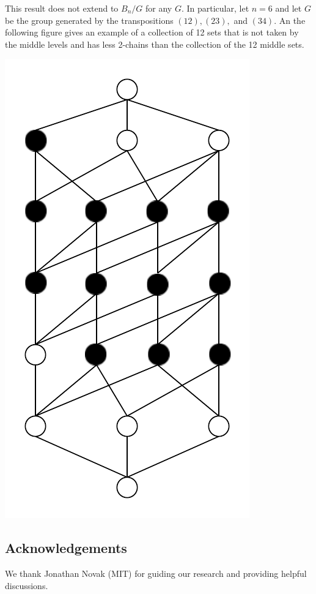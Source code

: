 \documentclass[12pt]{article}
\theoremstyle{plain}
\theoremstyle{definition}
\theoremstyle{remark}
\begin{document}
This result does not extend to $B_n / G$ for any $G$. In particular, let $n = 6$ and let $G$ be the group generated by the transpositions $(12), (23),$ and $(34)$. An the following figure gives an example of a collection of 12 sets that is not taken by the middle levels and has less 2-chains than the collection of the 12 middle sets.
\begin{center}
\includegraphics[scale=0.7]{counterexamplegraph.pdf}
\end{center}
\subsection*{Acknowledgements}
We thank Jonathan Novak (MIT) for guiding our research and providing helpful discussions.

%  
%  

\begin{thebibliography}{10}

\end{thebibliography}
\end{document}
